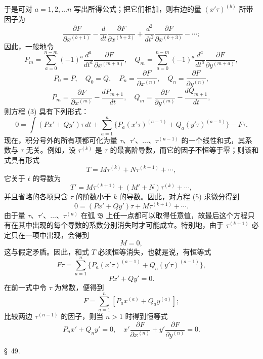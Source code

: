 \documentclass[11pt,a4paper,leqno]{article}
\begin{document}
于是可对 $a=1,2,\ldots n$ 写出所得公式；把它们相加，则右边的量 $(x'\tau)^{(b)}$ 所带因子为
\[
\frac{\partial F}{\partial x^{(b+1)}}
-\frac{d}{dt}\frac{\partial F}{\partial x^{(b+2)}}
+\frac{d^2}{dt^2}\frac{\partial F}{\partial x^{(b+3)}}-\cdots;
\]
因此，一般地令
\[
P_m=\sum_{a=0}^{n-m}(-1)^a\frac{d^a}{dt^a}\frac{\partial F}{\partial x^{(m+a)}},
\quad
Q_m=\sum_{a=0}^{n-m}(-1)^a\frac{d^a}{dt^a}\frac{\partial F}{\partial y^{(m+a)}},
\]
\[
P_0=P,\quad Q_0=Q,
\quad P_n=\frac{\partial F}{\partial x^{(n)}},
\quad Q_n=\frac{\partial F}{\partial y^{(n)}},
\]
\begin{equation}\tag{4}
P_m=\frac{\partial F}{\partial x^{(m)}}-\frac{dP_{m+1}}{dt},
\quad
Q_m=\frac{\partial F}{\partial y^{(m)}}-\frac{dQ_{m+1}}{dt},
\end{equation}
则方程 (3) 具有下列形式：
\begin{equation}\tag{5}
0=\int(Px'+Qy')\tau\,dt
+\sum_{a=1}^n\{P_a(x'\tau)^{(a-1)}+Q_a(y'\tau)^{(a-1)}\}-F\tau.
\end{equation}
现在，积分号外的所有项都可化为量 $\tau$、$\tau'$、$\ldots$、$\tau^{(n-1)}$ 的一个线性和式，其系数与 $\tau$ 无关。例如，设 $\tau^{(k)}$ 是 $\tau$ 的最高阶导数，而它的因子不恒等于零；则该和式具有形式
\[
T=M\tau^{(k)}+N\tau^{(k-1)}+\cdots,
\]
它关于 $t$ 的导数为
\[
T'=M\tau^{(k+1)}+(M'+N)\tau^{(k)}+\cdots,
\]
并且省略的各项只含 $\tau$ 的阶数小于 $k$ 的导数。因此，对方程 (5) 求微分得到
\[
0=(Px'+Qy')\tau+M\tau^{(k+1)}+\cdots.
\]
由于量 $\tau$、$\tau'$、$\ldots$、$\tau^{(n)}$ 在弧 $\mathfrak B$ 上任一点都可以取得任意值，故最后这个方程只有在其中出现的每个导数的系数分别消失时才可能成立。特别地，由于 $\tau^{(k+1)}$ 必定只在一项中出现，会得到
\[
M=0,
\]
这与假定矛盾。因此，和式 $T$ 必须恒等消失，也就是说，有恒等式
\[
F\tau=\sum_{a=1}^n\{P_a(x'\tau)^{(a-1)}+Q_a(y'\tau)^{(a-1)}\},
\]
\begin{equation}\tag{6}
Px'+Qy'=0.
\end{equation}
在前一式中令 $\tau$ 为常数，便得到
\begin{equation}\tag{7}
F=\sum_{a=1}^n[P_ax^{(a)}+Q_ay^{(a)}];
\end{equation}
比较两边 $\tau^{(n-1)}$ 的因子，则当 $n>1$ 时得到恒等式
\begin{equation}\tag{8}
P_nx'+Q_ny'=0,
\quad
x'\frac{\partial F}{\partial x^{(n)}}+y'\frac{\partial F}{\partial y^{(n)}}=0.
\end{equation}

\begin{center}
{\large \S~49.}
\end{center}
\end{document}
